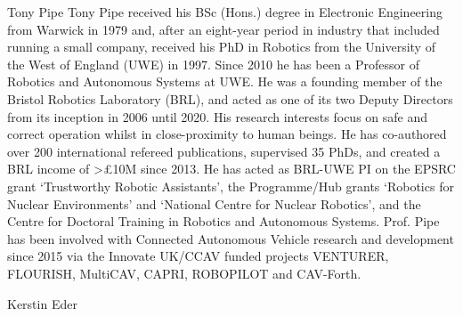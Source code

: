 \documentclass[letterpaper, 10 pt, journal, twoside]{IEEEtran}
\begin{document}
\begin{IEEEbiography}{Tony Pipe}
Tony Pipe received his BSc (Hons.) degree in Electronic Engineering from Warwick in 1979 and, after an eight-year period in industry that included running a small company, received his PhD in Robotics from the University of the West of England (UWE) in 1997. Since 2010 he has been a Professor of Robotics and Autonomous Systems at UWE. He was a founding member of the Bristol Robotics Laboratory (BRL), and acted as one of its two Deputy Directors from its inception in 2006 until 2020. His research interests focus on safe and correct operation whilst in close-proximity to human beings. He has co-authored over 200 international refereed publications, supervised 35 PhDs, and created a BRL income of >£10M since 2013. He has acted as BRL-UWE PI on the EPSRC grant ‘Trustworthy Robotic Assistants’, the Programme/Hub grants ‘Robotics for Nuclear Environments’ and ‘National Centre for Nuclear Robotics’, and the Centre for Doctoral Training in Robotics and Autonomous Systems. Prof. Pipe has been involved with Connected Autonomous Vehicle research and development since 2015 via the Innovate UK/CCAV funded projects VENTURER, FLOURISH, MultiCAV, CAPRI, ROBOPILOT and CAV-Forth.
\end{IEEEbiography}

\begin{IEEEbiography}{Kerstin Eder}
\end{IEEEbiography}
\end{document}
